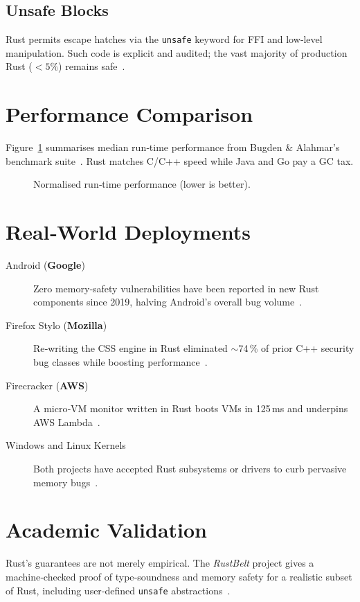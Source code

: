 \documentclass[11pt]{article}
\begin{document}
\subsection{Unsafe Blocks}
Rust permits escape hatches via the \texttt{unsafe} keyword for
FFI and low‑level manipulation.
Such code is explicit and audited; the vast majority of production
Rust (\(<\!5\%\)) remains safe~\cite{jung2018rustbelt}.

\section{Performance Comparison}
Figure~\ref{fig:perf} summarises median run‑time performance from
Bugden \& Alahmar’s benchmark suite~\cite{bugden2022study}.
Rust matches C/C++ speed while Java and Go pay a GC tax.

\begin{figure}[h]
    \centering
    \caption{Normalised run‑time performance (lower is better).}
    \label{fig:perf}
\end{figure}

\section{Real‑World Deployments}
\begin{description}
    \item[Android (\textbf{Google})] Zero memory‑safety
    vulnerabilities have been reported in new Rust components since 2019,
    halving Android’s overall bug volume~\cite{google2022androidReport}.
    \item[Firefox Stylo (\textbf{Mozilla})] Re‑writing the CSS engine
    in Rust eliminated \(\sim\)74\,\% of prior C++ security bug classes
    while boosting performance~\cite{mozilla2017stylo}.
    \item[Firecracker (\textbf{AWS})] A micro‑VM monitor written in Rust
    boots VMs in 125\,ms and underpins AWS Lambda~\cite{aws2019firecracker}.
    \item[Windows and Linux Kernels] Both projects have accepted Rust
    subsystems or drivers to curb pervasive memory bugs~\cite{msrc2019survey}.
\end{description}

\section{Academic Validation}
Rust’s guarantees are not merely empirical.
The \emph{RustBelt} project gives a machine‑checked proof of
type‑soundness and memory safety for a realistic subset of Rust,
including user‑defined \texttt{unsafe} abstractions~\cite{jung2018rustbelt}.
\end{document}
